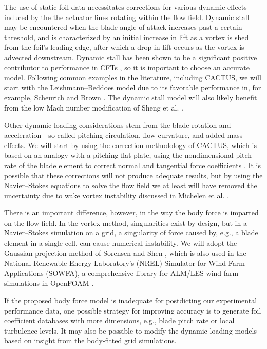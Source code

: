 The use of static foil data necessitates corrections for various dynamic effects
induced by the the actuator lines rotating within the flow field. Dynamic stall
may be encountered when the blade angle of attack increases past a certain
threshold, and is characterized by an initial increase in lift as a vortex is
shed from the foil's leading edge, after which a drop in lift occurs as the
vortex is advected downstream. Dynamic stall has been shown to be a significant
positive contributor to performance in CFTs \cite{Para2002, Urbina2013}, so it
is important to choose an accurate model. Following common examples in the
literature, including CACTUS, we will start with the Leishmann--Beddoes model
due to its favorable performance in, for example, Scheurich and Brown
\cite{Scheurich2011}. The dynamic stall model will also likely benefit from the
low Mach number modification of Sheng et al. \cite{Sheng2008}.

Other dynamic loading considerations stem from the blade rotation and
acceleration---so-called pitching circulation, flow curvature, and added-mass
effects. We will start by using the correction methodology of CACTUS, which is
based on an analogy with a pitching flat plate, using the nondimensional pitch
rate of the blade element to correct normal and tangential force coefficients
\cite{Murray2011}. It is possible that these corrections will not produce
adequate results, but by using the Navier--Stokes equations to solve the flow
field we at least will have removed the uncertainty due to wake vortex
instability discussed in Michelen et al. \cite{Michelen2014}.

There is an important difference, however, in the way the body force is imparted
on the flow field. In the vortex method, singularities exist by design, but in a
Navier--Stokes simulation on a grid, a singularity of force caused by, e.g., a
blade element in a single cell, can cause numerical instability. We will adopt
the Gaussian projection method of Sorensen and Shen \cite{Sorensen2002}, which
is also used in the National Renewable Energy Laboratory's (NREL) Simulator for
Wind Farm Applications (SOWFA), a comprehensive library for ALM/LES wind farm
simulations in OpenFOAM \cite{Churchfield2013}.

If the proposed body force model is inadequate for postdicting our experimental
performance data, one possible strategy for improving accuracy is to generate
foil coefficient databases with more dimensions, e.g., blade pitch rate or local
turbulence levels. It may also be possible to modify the dynamic loading models
based on insight from the body-fitted grid simulations.

